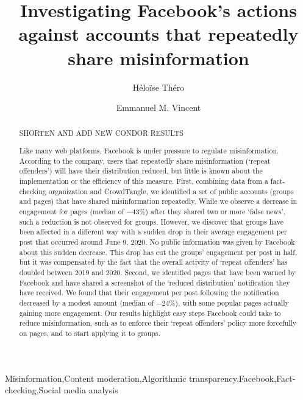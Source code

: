\documentclass[review]{elsarticle}
\begin{document}
\begin{frontmatter}

\title{Investigating Facebook's actions against accounts that repeatedly share misinformation}

\author[mymainaddress]{Héloïse Théro}

\author[mymainaddress]{Emmanuel M. Vincent}

\address[mymainaddress]{médialab - Sciences Po, Paris, France}

\begin{abstract}

{\color{red} SHORTEN AND ADD NEW CONDOR RESULTS

Like many web platforms, Facebook is under pressure to regulate misinformation. 
According to the company, users that repeatedly share misinformation (`repeat offenders') will have their distribution reduced, but little is known about the implementation or the efficiency of this measure.
First, combining data from a fact-checking organization and CrowdTangle, we identified a set of public accounts (groups and pages) that have shared misinformation repeatedly. 
While we observe a decrease in engagement for pages (median of $-43\%$) after they shared two or more `false news', such a reduction is not observed for groups. 
However, we discover that groups have been affected in a different way with a sudden drop in their average engagement per post that occurred around June 9, 2020.
No public information was given by Facebook about this sudden decrease.
This drop has cut the groups’ engagement per post in half, but it was compensated by the fact that the overall activity of `repeat offenders' has doubled between 2019 and 2020.
Second, we identified pages that have been warned by Facebook and have shared a screenshot of the `reduced distribution' notification they have received. 
We found that their engagement per post following the notification decreased by a modest amount (median of $-24\%$), with some popular pages actually gaining more engagement.
Our results highlight easy steps Facebook could take to reduce misinformation, such as to enforce their `repeat offenders' policy more forcefully on pages, and to start applying it to groups.}
\end{abstract}

\begin{keyword}
Misinformation\sep Content moderation\sep Algorithmic transparency\sep Facebook\sep Fact-checking\sep Social media analysis
\end{keyword}

\end{frontmatter}
\end{document}
